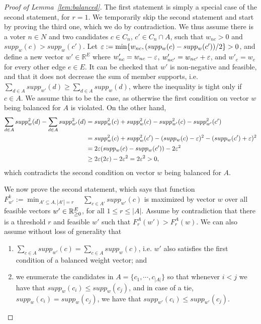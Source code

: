 \begin{proof}[Proof of Lemma~\ref{lem:balanced}]
The first statement is simply a special case of the second statement, for $r=1$. 
We temporarily skip the second statement and start by proving the third one, which we do by contradiction. 
We thus assume there is a voter $n\in N$ and two candidates $c\in C_n$, $c'\in C_n\cap A$, such that $w_{nc}>0$ and $supp_w(c) > supp_w(c')$. 
Let $\varepsilon:=\min\{w_{nc}, (supp_w(c)-supp_w(c'))/2\}>0$, and define a new vector $w'\in\mathbb{R}^E$ where $w'_{nc}=w_{nc}-\varepsilon$, $w'_{nc'}=w_{nc'}+\varepsilon$, and $w'_e=w_e$ for every other edge $e\in E$. 
It can be checked that $w'$ is non-negative and feasible, and that it does not decrease the sum of member supports, i.e. $\sum_{d\in A} supp_{w'}(d)\geq \sum_{d\in A} supp_{w}(d)$, where the inequality is tight only if $c\in A$. We assume this to be the case, as otherwise the first condition on vector $w$ being balanced for $A$ is violated. On the other hand,
\begin{align*}
    \sum_{d\in A} supp_{w}^2(d) - \sum_{d\in A} supp_{w'}^2(d) &= supp_w^2(c) + supp_w^2(c) - supp_{w'}^2(c) - supp_{w'}^2(c') \\
    &= supp_w^2(c) + supp_w^2(c') - (supp_w(c)-\varepsilon)^2 - (supp_w(c')+\varepsilon)^2 \\
    &= 2\varepsilon( supp_w(c) - supp_w(c')) -2\varepsilon^2 \\
    &\geq 2\varepsilon(2\varepsilon) - 2\varepsilon^2 = 2\varepsilon^2 >0,
\end{align*}
which contradicts the second condition on vector $w$ being balanced for $A$.

We now prove the second statement, which says that function 
$F_{w'}^k:=\min_{A'\subseteq A, |A'|=r} \quad \sum_{c\in A'} supp_{w'}(c)$ 
is maximized by vector $w$ over all feasible vectors $w'\in\mathbb{R}_{\geq 0}^E$, for all $1\leq r\leq |A|$. 
Assume by contradiction that there is a threshold $r$ and feasible $w'$ such that $F_r^A(w')>F_r^A(w)$. We can also assume without loss of generality that 
\begin{enumerate}
    \item $\sum_{c\in A} supp_{w'}(c)=\sum_{c\in A} supp_{w}(c)$, i.e. $w'$ also satisfies the first condition of a balanced weight vector; and  
    \item we enumerate the candidates in $A=\{c_1, \cdots, c_{|A|}\}$ so that whenever $i<j$ we have that $supp_w(c_i)\leq supp_w(c_j)$, and in case of a tie, $supp_w(c_i)= supp_w(c_j)$, we have that $supp_{w'}(c_i)\leq supp_{w'}(c_j)$. 
\end{enumerate}


\end{proof}
